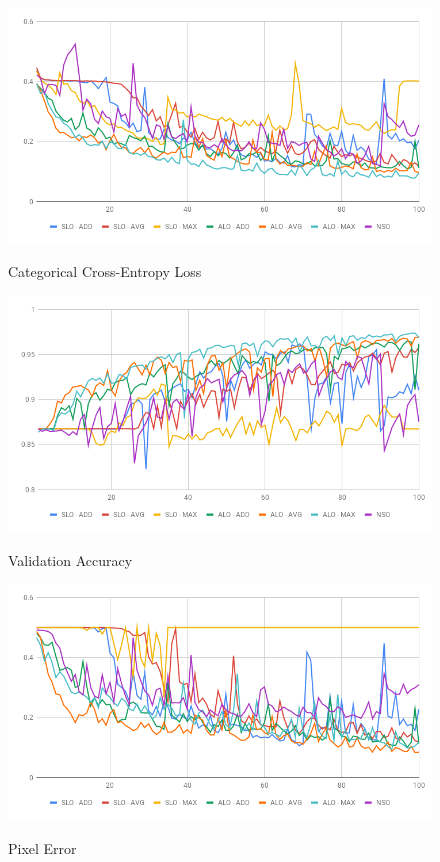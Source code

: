 \begin{figure}
  \caption{Categorical Cross-Entropy Loss}
  \centering
  \includegraphics[width=1.\columnwidth]{figures/falreis/validation_loss.png}
  \label{fig:validation_loss}
\end{figure}

\begin{figure}
  \caption{Validation Accuracy}
  \centering
  \includegraphics[width=1.\columnwidth]{figures/falreis/validation_accuracy.png}
  \label{fig:validation_accuracy}
\end{figure}

\begin{figure}
  \caption{Pixel Error}
  \centering
  \includegraphics[width=1.\columnwidth]{figures/falreis/pixel_error.png}
  \label{fig:pixel_error}
\end{figure}

